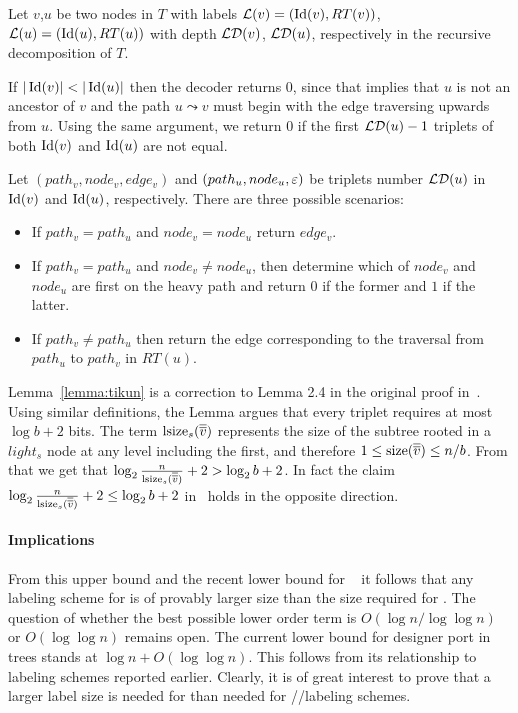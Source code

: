 Let $v$,$u$ be two nodes in $T$ with labels $ \mathcal{L}(v) = (\operatorname{Id}(v),RT(v))$, $ \mathcal{L}(u)= (\operatorname{Id}(u),RT(u))$ with depth  $ \mathcal{LD}(v)$, $ \mathcal{LD}(u)$, respectively in the recursive decomposition of $T$.
 
 If $\vert \operatorname{Id}(v) \vert  < \vert \operatorname{Id}(u) \vert $ then the decoder returns $0$, since that implies that $u$ is not an ancestor of $v$ and the path $u \leadsto v$ must begin with the edge traversing upwards from $u$.
Using the same argument,  we  return $0$ if the first $ \mathcal{LD}(u)-1$ triplets of both $\operatorname{Id}(v)$ and $\operatorname{Id}(u)$ are not equal.
 
 Let $(path_v,node_v,edge_v)$ and $(path_u,node_u,\varepsilon)$ be   triplets number $ \mathcal{LD}(u)$ in $\operatorname{Id}(v)$ and $\operatorname{Id}(u)$, respectively.
There are three possible scenarios:
\begin{itemize}
	\item If $path_v = path_u$ and $node_v = node_u$ return $edge_v$.
	\item If $path_v = path_u$ and $node_v \neq node_u$, then determine which of $node_v$ and $node_u$ are first on the heavy path and return $0$ if the former and $1$ if the latter.
	\item If $path_v \neq path_u$ then return the edge corresponding to the traversal from $path_u$ to $path_v$ in  $RT(u)$.
\end{itemize}

		
Lemma~\ref{lemma:tikun} is a  correction to Lemma 2.4 in the  original proof in~\cite{Thorup01}.
Using similar definitions, the Lemma argues that every triplet requires at most $\log b +2$ bits. 
The term $\operatorname{lsize}_s(\overline{\overline{v}})$ represents the size of the subtree rooted in a  $light_s$ node at any level including the first, and  therefore  $1\leq \operatorname{size}(\overline{\overline{v}}) \leq n/b$. From that we get that $\log_2 \frac{n}{\operatorname{lsize}_s(\overline{\overline{v}})}+2 > \log_2 b +2$.
In fact the claim $\log_2 \frac{n}{\operatorname{lsize}_s(\overline{\overline{v}})}+2 \leq \log_2 b +2$  in~\cite{Thorup01}  holds in the opposite direction. 

 
\paragraph{Implications}		
From  this upper bound  and the recent lower bound for \NCA~\cite{Green14} it follows that any labeling scheme for \NCA is of  provably larger size than the size required for \routing.
The question of whether  the best possible lower order term is  $O(\log n / \log \log n)$ or  $O(\log \log n)$ remains open. 
The current lower bound for designer port \routing in trees stands at $\log n + O (\log \log n)$. This follows from its relationship to \ancestry labeling schemes reported earlier. Clearly, it is of great interest to prove that a larger label size is needed for \routing  than needed for  \ancestry/\siblings/\connectivity labeling schemes.



